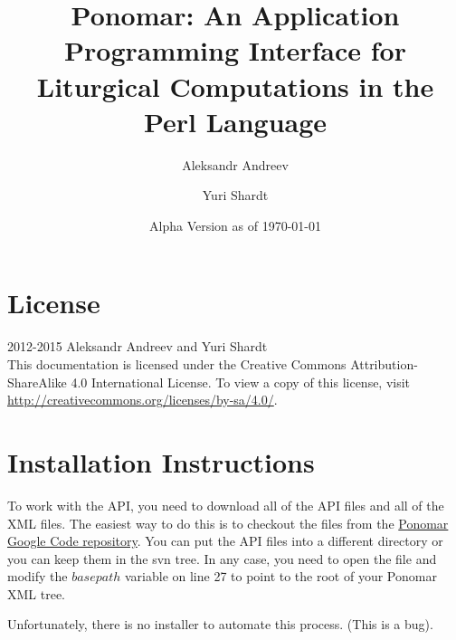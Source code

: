 \documentclass{article}
\title{Ponomar: An Application Programming Interface for Liturgical Computations in the Perl Language}
\author{Aleksandr Andreev \and Yuri Shardt}
\date{Alpha Version as of \today}
\begin{document}
\maketitle
\tableofcontents
\clearpage

\section{License}
\textcopyright{} 2012-2015 Aleksandr Andreev and Yuri Shardt \\

This documentation is licensed under the Creative Commons Attribution-ShareAlike 4.0 International License. To view a copy of this license, visit \href{http://creativecommons.org/licenses/by-sa/4.0/}{http://creativecommons.org/licenses/by-sa/4.0/}.

\section{Installation Instructions}

To work with the API, you need to download all of the API files and all of the XML files. The easiest way to do this is to checkout the files from the \href{https://code.google.com/p/ponomar}{Ponomar Google Code repository}.
You can put the API files into a different directory or you can keep them in the svn tree. In any case, you need to open the  file and
modify the $basepath$ variable on line 27 to point to the root of your Ponomar XML tree. 

Unfortunately, there is no installer to automate this process. (This is a bug).

\clearpage
\end{document}
